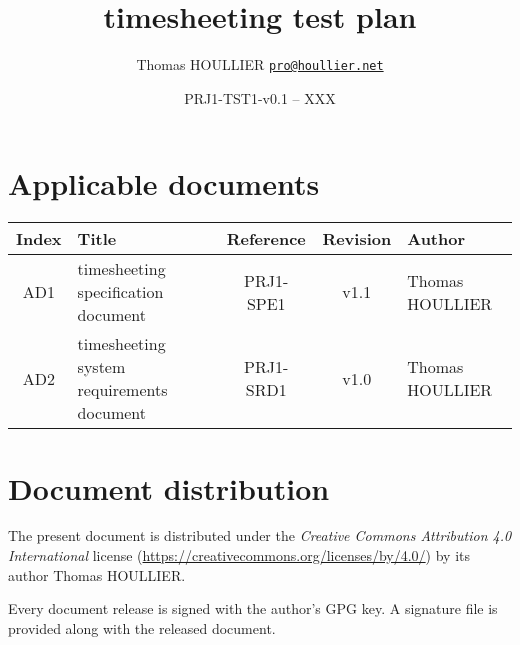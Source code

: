 \documentclass[letterpaper]{article}
\title{timesheeting test plan}
\author{Thomas HOULLIER \href{mailto:pro@houllier.net}
         {\texttt{\textlangle pro@houllier.net\textrangle}}}
\begin{document}
\frenchspacing
\date{PRJ1-TST1-v0.1 -- XXX}
\maketitle
\thispagestyle{FirstPage}

\begin{abstract}
\end{abstract}

\begin{versionhistory}
\end{versionhistory}
\setcounter{table}{0} %

\section*{Applicable documents}
{ \centering
\begin{tabularx}{\textwidth}{| c | X | c | c | X |} \hline
  Index & Title & Reference & Revision & Author \\ \hline
  AD1   & timesheeting specification document & PRJ1-SPE1 & v1.1 & Thomas
  HOULLIER \\ \hline
  AD2   & timesheeting system requirements document & PRJ1-SRD1 & v1.0 & Thomas
  HOULLIER \\
  \hline \end{tabularx} \par }

\section*{Document distribution}
The present document is distributed under the \emph{Creative Commons Attribution
4.0 International} license (\url{https://creativecommons.org/licenses/by/4.0/})
by its author Thomas HOULLIER.

Every document release is signed with the author's GPG key. A signature file
is provided along with the released document.

\tableofcontents
\printglossary[type=\acronymtype,style=index]
\pagestyle{plain}






\appendix


\apptocmd{\thebibliography}{\raggedright}{}{}
\begingroup
{}
\setlength\bibitemsep{0pt}
\printbibliography
\endgroup
\end{document}
